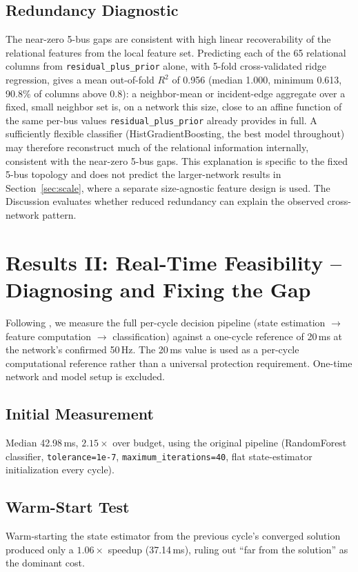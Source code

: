 \documentclass[conference]{IEEEtran}
\begin{document}
\subsection{Redundancy Diagnostic}
The near-zero 5-bus gaps are consistent with high linear recoverability of the relational features from the local feature set. Predicting each of the 65 relational columns from \texttt{residual\_plus\_prior} alone, with 5-fold cross-validated ridge regression, gives a mean out-of-fold $R^2$ of 0.956 (median 1.000, minimum 0.613, 90.8\% of columns above 0.8): a neighbor-mean or incident-edge aggregate over a fixed, small neighbor set is, on a network this size, close to an affine function of the same per-bus values \texttt{residual\_plus\_prior} already provides in full. A sufficiently flexible classifier (HistGradientBoosting, the best model throughout) may therefore reconstruct much of the relational information internally, consistent with the near-zero 5-bus gaps. This explanation is specific to the fixed 5-bus topology and does not predict the larger-network results in Section~\ref{sec:scale}, where a separate size-agnostic feature design is used. The Discussion evaluates whether reduced redundancy can explain the observed cross-network pattern.

\section{Results II: Real-Time Feasibility -- Diagnosing and Fixing the Gap}
\label{sec:latency}

Following \cite{abukhousa2026latency}, we measure the full per-cycle decision pipeline (state estimation $\rightarrow$ feature computation $\rightarrow$ classification) against a one-cycle reference of 20\,ms at the network's confirmed 50\,Hz. The 20\,ms value is used as a per-cycle computational reference rather than a universal protection requirement. One-time network and model setup is excluded.

\subsection{Initial Measurement}
Median 42.98\,ms, $2.15\times$ over budget, using the original pipeline (RandomForest classifier, \texttt{tolerance=1e-7}, \texttt{maximum\_iterations=40}, flat state-estimator initialization every cycle).

\subsection{Warm-Start Test}
Warm-starting the state estimator from the previous cycle's converged solution produced only a $1.06\times$ speedup (37.14\,ms), ruling out ``far from the solution'' as the dominant cost.
\end{document}
